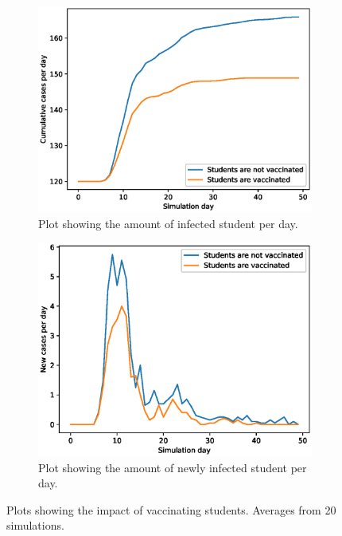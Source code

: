 \documentclass[runningheads]{llncs}
\begin{document}
\begin{figure}[h!]
	\centering
	\begin{subfigure}[b]{0.7\linewidth}
		\includegraphics[width=\textwidth]{vaccinating_cases_cum_20runs.eps}
		\caption{Plot showing the amount of infected student per day.} 	
	\end{subfigure}
	\begin{subfigure}[b]{0.7\linewidth}
		\includegraphics[width=\textwidth]{vaccinating_cases_per_day_20runs.eps}
		\caption{Plot showing the amount of newly infected student per day.} 
	\end{subfigure}
	\caption{Plots showing the impact of vaccinating students. Averages from 20 simulations.}
	\label{VaccinePlot}
\end{figure}
\end{document}

